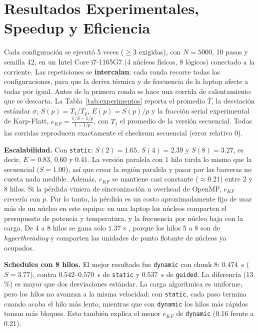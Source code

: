 \documentclass[11pt,a4paper]{article}
\begin{document}
\section{Resultados Experimentales, Speedup y Eficiencia}
Cada configuración se ejecutó 5 veces ($\geq 3$ exigidas), con $N = 5000$, 10 pasos y semilla 42, en un Intel Core i7-1165G7 (4 núcleos físicos, 8 lógicos) conectado a la corriente. Las repeticiones se \textbf{intercalan}: cada ronda recorre todas las configuraciones, para que la deriva térmica y de frecuencia de la laptop afecte a todas por igual. Antes de la primera ronda se hace una corrida de calentamiento que se descarta. La Tabla~\ref{tab:experimentos} reporta el promedio $\bar{T}$, la desviación estándar $\sigma$, $S(p) = T_1/T_p$, $E(p) = S(p)/p$ y la fracción serial experimental de Karp-Flatt, $e_{KF} = \frac{1/S - 1/p}{1 - 1/p}$, con $T_1$ el promedio de la versión secuencial. Todas las corridas reproducen exactamente el checksum secuencial (error relativo $0$).



\textbf{Escalabilidad.} Con \texttt{static}: $S(2)=1.65$, $S(4)=2.39$ y $S(8)=3.27$, es decir, $E = 0.83$, $0.60$ y $0.41$. La versión paralela con 1 hilo tarda lo mismo que la secuencial ($S = 1.00$), así que crear la región paralela y pasar por las barreras no cuesta nada medible. Además, $e_{KF}$ se mantiene casi constante ($\approx 0.21$) entre 2 y 8 hilos. Si la pérdida viniera de sincronización u overhead de OpenMP, $e_{KF}$ crecería con $p$. Por lo tanto, la pérdida es un costo aproximadamente fijo de usar más de un núcleo en este equipo: en una laptop los núcleos comparten el presupuesto de potencia y temperatura, y la frecuencia por núcleo baja con la carga. De 4 a 8 hilos se gana solo $1.37\times$, porque los hilos 5 a 8 son de \textit{hyperthreading} y comparten las unidades de punto flotante de núcleos ya ocupados.

\textbf{Schedules con 8 hilos.} El mejor resultado fue \texttt{dynamic} con chunk 8: $0.474$~s ($S = 3.77$), contra $0.542$--$0.570$~s de \texttt{static} y $0.537$~s de \texttt{guided}. La diferencia (13\,\%) es mayor que dos desviaciones estándar. La carga algorítmica es uniforme, pero los hilos no avanzan a la misma velocidad: con \texttt{static}, cada paso termina cuando acaba el hilo más lento, mientras que con \texttt{dynamic} los hilos más rápidos toman más bloques. Esto también explica el menor $e_{KF}$ de \texttt{dynamic} (0.16 frente a 0.21).
\end{document}
